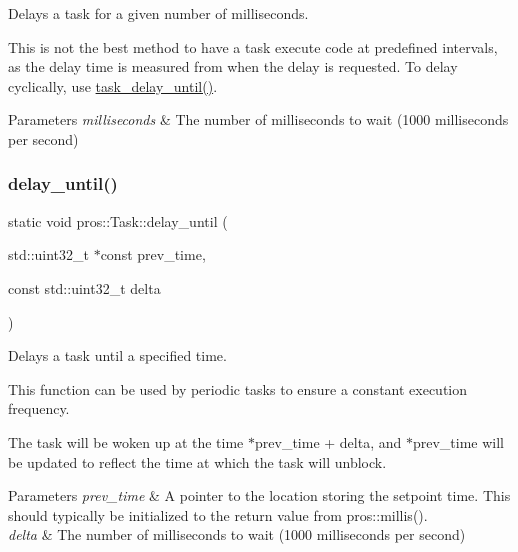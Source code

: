 Delays a task for a given number of milliseconds. 

This is not the best method to have a task execute code at predefined intervals, as the delay time is measured from when the delay is requested. To delay cyclically, use \hyperlink{rtos_8h_a61c8ccf83a0dc79fc0e9fde5e87a0329}{task\+\_\+delay\+\_\+until()}.


\begin{DoxyParams}{Parameters}
{\em milliseconds} & The number of milliseconds to wait (1000 milliseconds per second) \\
\hline
\end{DoxyParams}
\mbox{\label{classpros_1_1Task_aa038d0eeb973ce7fca8689fa5bb91fec}} 
\subsubsection{\texorpdfstring{delay\+\_\+until()}{delay\_until()}}
{\footnotesize\ttfamily static void pros\+::\+Task\+::delay\+\_\+until (\begin{DoxyParamCaption}\item[{std\+::uint32\+\_\+t $\ast$const}]{prev\+\_\+time,  }\item[{const std\+::uint32\+\_\+t}]{delta }\end{DoxyParamCaption})\hspace{0.3cm}{\ttfamily [static]}}



Delays a task until a specified time. 

This function can be used by periodic tasks to ensure a constant execution frequency.

The task will be woken up at the time $\ast$prev\+\_\+time + delta, and $\ast$prev\+\_\+time will be updated to reflect the time at which the task will unblock.


\begin{DoxyParams}{Parameters}
{\em prev\+\_\+time} & A pointer to the location storing the setpoint time. This should typically be initialized to the return value from pros\+::millis(). \\
\hline
{\em delta} & The number of milliseconds to wait (1000 milliseconds per second) \\
\hline
\end{DoxyParams}
\mbox{\label{classpros_1_1Task_a9b1eda960abda807cb8447075fc4ea44}} 
